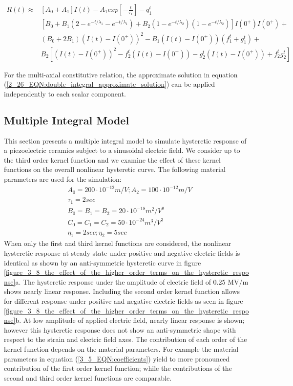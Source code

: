 \begin{equation}
\begin{aligned}
R(t) \approx 
&\left[A_0+ A_1 \right]I(t)-A_1 exp \left[- \frac{t}{\tau_1}\right] -q_1^t \\
&\left[B_0+B_1 (2-e^{-t/\lambda_1}-e^{-t/\lambda_1}) +B_2(1-e^{-t/\lambda_2})(1-e^{-t/\lambda_2}) \right]I(0^+)I(0^+)+ \\
&(B_0+2B_1)(I(t)-I(0^+))^2-B_1(I(t)-I(0^+))(f_1^t+g_1^t)+\\
&B_2\left[ (I(t)-I(0^+))^2 -f_2^t (I(t)-I(0^+)) -g_2^t (I(t)-I(0^+)) +f_2^t g_2^t\right]
\end{aligned} 
\label{2_26_EQN:double_integral_approximate_solution}
\end{equation}

For the multi-axial constitutive relation, the approximate solution in equation (\ref{2_26_EQN:double_integral_approximate_solution}) can be applied independently to each scalar component. 

\subsection{Multiple Integral Model}
This section presents a multiple integral model to simulate hysteretic response of a piezoelectric ceramics subject to a sinusoidal electric field. 
We consider up to the third order kernel function and we examine the effect of these kernel functions on the overall nonlinear hysteretic curve. 
The following material parameters are used for the simulation:
\begin{equation}
\begin{aligned}
&A_0=200 \cdot 10^{-12} m/V; A_2=100 \cdot 10^{-12} m/V \\
&\tau_1=2 sec \\
&B_0=B_1=B_2=20 \cdot 10^{-18} m^2/V^2 \\
&C_0=C_1=C_2=50 \cdot 10^{-24} m^3/V^3 \\
&\eta_1=2sec; \eta_2=5 sec  
\end{aligned}
\label{3_5_EQN:coefficients}
\end{equation}
When only the first and third kernel functions are considered, the nonlinear hysteretic response at steady state under positive and negative electric fields is identical as shown by an anti-symmetric hysteretic curve in figure \ref{figure_3_8_the_effect_of_the_higher_order_terms_on_the_hysteretic_response}a. 
The hysteretic response under the amplitude
of electric field of 0.25 MV/m shows nearly linear response. Including the second order
kernel function allows for different response under positive and negative electric fields as
seen in figure \ref{figure_3_8_the_effect_of_the_higher_order_terms_on_the_hysteretic_response}b. At low amplitude of applied electric field, nearly linear response is shown;
however this hysteretic response does not show an anti-symmetric shape with respect to the
strain and electric field axes. The contribution of each order of the kernel function depends
on the material parameters. For example the material parameters in equation (\ref{3_5_EQN:coefficients}) yield to more
pronounced contribution of the first order kernel function; while the contributions of the
second and third order kernel functions are comparable.

